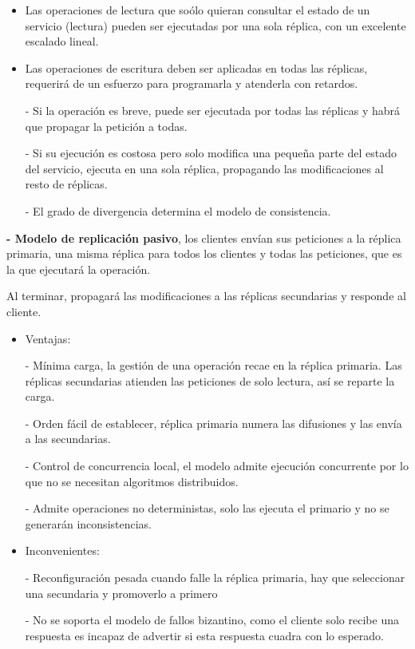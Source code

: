 \documentclass[12pt]{amsart}
\begin{document}
    \begin{itemize}
        \item Las operaciones de lectura que soólo quieran consultar el estado de un servicio (lectura) pueden ser ejecutadas por una sola réplica, con un excelente escalado lineal.
        \item Las operaciones de escritura deben ser aplicadas en todas las réplicas, requerirá de un esfuerzo para programarla y atenderla con retardos.
        
        - Si la operación es breve, puede ser ejecutada por todas las réplicas y habrá que propagar la petición a todas.
        
        - Si su ejecución es costosa pero solo modifica una pequeña parte del estado del servicio, ejecuta en una sola réplica, propagando las modificaciones al resto de réplicas.
        
        - El grado de divergencia determina el modelo de consistencia.
    \end{itemize}
    
    \textbf{- Modelo de replicación pasivo}, los clientes envían sus peticiones a la réplica primaria, una misma réplica para todos los clientes y todas las peticiones, que es la que ejecutará la operación.
    
    Al terminar, propagará las modificaciones a las réplicas secundarias y responde al cliente.
    
    \begin{itemize}
        \item Ventajas:
        
        - Mínima carga, la gestión de una operación recae en la réplica primaria. Las réplicas secundarias atienden las peticiones de solo lectura, así se reparte la carga.
        
        - Orden fácil de establecer, réplica primaria numera las difusiones y las envía a las secundarias.
        
        - Control de concurrencia local, el modelo admite ejecución concurrente por lo que no se necesitan algoritmos distribuidos.
        
        - Admite operaciones no deterministas, solo las ejecuta el primario y no se generarán inconsistencias.
    
    \item Inconvenientes:
    
    - Reconfiguración pesada cuando falle la réplica primaria, hay que seleccionar una secundaria y promoverlo a primero
    
    - No se soporta el modelo de fallos bizantino, como el cliente solo recibe una respuesta es incapaz de advertir si esta respuesta cuadra con lo esperado.
    \end{itemize}
    
\end{document}
